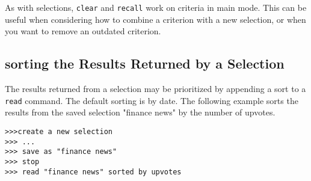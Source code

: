 As with selections, \texttt{clear} and \texttt{recall} work on criteria in main mode. This can be useful when
considering how to combine a criterion with a new selection, or when you want to remove an
outdated criterion.

\subsection{sorting the Results Returned by a Selection}
The results returned from a selection may be prioritized by appending a sort to a \texttt{read} command.
The default sorting is by date. The following example sorts the results from the saved selection
"finance news" by the number of upvotes.
\newline\begin{minipage}{\linewidth}\begin{lstlisting}
>>>create a new selection
>>> ...
>>> save as "finance news"
>>> stop
>>> read "finance news" sorted by upvotes
\end{lstlisting}\end{minipage}
